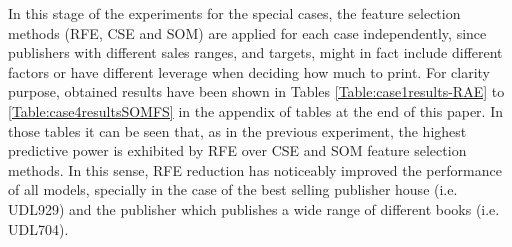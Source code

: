\documentclass[a4paper,10pt,twocolumn,preprint,3p]{elsarticle}
\begin{document}


In this stage of the experiments for the special cases, the
feature selection methods (RFE, CSE and SOM) are applied for each case
independently, since publishers with different sales ranges, and
targets, might in fact include different factors or have different
leverage when deciding how much to print. 
For clarity purpose, obtained results have been shown in Tables
\ref{Table:case1results-RAE} to \ref{Table:case4resultsSOMFS}
in the appendix of tables at the end of this paper.
In those tables it can be seen that, as in the previous experiment, the highest 
predictive power is exhibited by RFE over CSE and SOM feature selection methods.
In this sense, RFE reduction has noticeably improved the performance of all models, 
specially in the case of the best selling publisher house (i.e. UDL929) and the 
publisher which publishes a wide range of different books (i.e. UDL704). 

\end{document}
